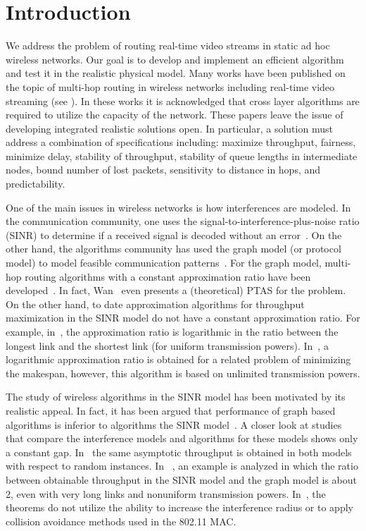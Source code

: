 \documentclass[12pt]{article}
\newenvironment{proof sketch}[1]{\noindent {\emph{Proof sketch of #1:}}}{\hfill \qed}
\begin{document}
\section{Introduction}

We address the problem of routing real-time video streams in static ad
hoc wireless networks.  Our goal is to develop and implement an
efficient algorithm and test it in the realistic physical model.  Many
works have been published on the topic of multi-hop routing in
wireless networks including real-time video streaming (see
\cite{setton2005cross,khan2006application,shan2005cross,van2005cross}).
In these works it is acknowledged that cross layer algorithms are
required to utilize the capacity of the network.  These papers leave
the issue of developing integrated realistic solutions open. In
particular, a solution must address a combination of specifications
including: maximize throughput, fairness, minimize delay, stability of
throughput, stability of queue lengths in intermediate nodes, bound number of lost
packets, sensitivity to distance in hops, and predictability.

One of the main issues in wireless networks is how interferences are
modeled. In the communication community, one uses the
signal-to-interference-plus-noise ratio (SINR) to determine if a
received signal is decoded without an
error~\cite{gallager1968information}. On the other hand, the
algorithms community has used the graph model (or protocol model) to
model feasible communication
patterns~\cite{jain2005impact,alicherry2005joint11}. For the graph
model, multi-hop routing algorithms with a constant approximation
ratio have been
developed~\cite{kumar2005algorithmic,alicherry2005joint11,buragohain2007improved,wan2009multiflows}.
In fact, Wan~\cite{wan2009multiflows} even presents a (theoretical)
PTAS for the problem. On the other hand, to date approximation algorithms for
throughput maximization in the SINR model do not have a constant
approximation ratio. For example, in~\cite{ChafekarCapacity}, the
approximation ratio is logarithmic in the ratio between the longest
link and the shortest link (for uniform transmission powers).
In~\cite{K10}, a logarithmic approximation ratio is obtained for a
related problem of minimizing the makespan, however, this algorithm is
based on unlimited transmission powers.

The study of wireless algorithms in the SINR model has been motivated
by its realistic appeal. In fact, it has been argued that performance
of graph based algorithms is inferior to algorithms the SINR
model~\cite{goussevskaia2007complexity}.  A closer look at studies
that compare the interference models and algorithms for these
models shows only a constant gap.
In~\cite{gupta2000capacity} the same asymptotic throughput is obtained
in both models with respect to random instances. In
~\cite{moscibroda2006protocol}, an example is analyzed in which the
ratio between obtainable throughput in the SINR model and the graph
model is about $2$, even with very long links and nonuniform
transmission powers. In~\cite{behzad2004performance}, the theorems do
not utilize the ability to increase the interference radius or to
apply collision avoidance methods used in the 802.11 MAC.
\end{document}
